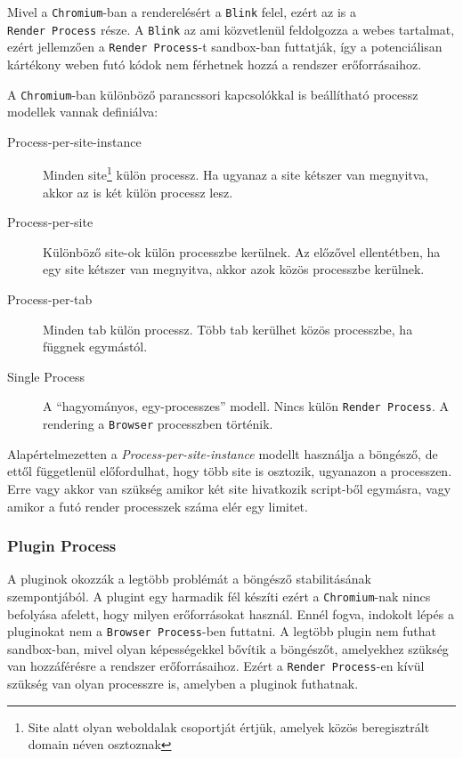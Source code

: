 \documentclass[12pt]{report}
\begin{document}
Mivel a \texttt{Chromium}-ban a renderelésért a \texttt{Blink} felel, ezért az is a \\
\texttt{Render Process} része. A \texttt{Blink} az ami közvetlenül feldolgozza a webes
tartalmat, ezért jellemzően a \texttt{Render Process}-t sandbox-ban futtatják, így a
potenciálisan kártékony weben futó kódok nem férhetnek hozzá a rendszer erőforrásaihoz.

A \texttt{Chromium}-ban különböző parancssori kapcsolókkal is beállítható processz modellek
vannak definiálva:
\begin{description}
    \item[Process-per-site-instance]
        Minden site\footnote{Site alatt olyan weboldalak csoportját értjük, amelyek
        közös beregisztrált domain néven osztoznak} külön processz.
        Ha ugyanaz a site kétszer van megnyitva, akkor az is két külön processz lesz.
    \item[Process-per-site]
        Különböző site-ok külön processzbe kerülnek. Az előzővel ellentétben, ha egy site
        kétszer van megnyitva, akkor azok közös processzbe kerülnek.
    \item[Process-per-tab]
        Minden tab külön processz. Több tab kerülhet közös processzbe, ha függnek egymástól.
    \item[Single Process]
        A ``hagyományos, egy-processzes'' modell. Nincs külön \texttt{Render Process}.
        A rendering a \texttt{Browser} processzben történik.
\end{description}

Alapértelmezetten a \textit{Process-per-site-instance} modellt használja a böngésző, de
ettől függetlenül előfordulhat, hogy több site is osztozik, ugyanazon a processzen.
Erre vagy akkor van szükség amikor két site hivatkozik script-ből egymásra,
vagy amikor a futó render processzek száma elér egy limitet.
\cite{bib-chromium-process-models}

\subsubsection{Plugin Process}
A pluginok okozzák a legtöbb problémát a böngésző stabilitásának szempontjából. A plugint
egy harmadik fél készíti ezért a \texttt{Chromium}-nak nincs befolyása afelett, hogy milyen
erőforrásokat használ. Ennél fogva, indokolt lépés a pluginokat nem a
\texttt{Browser Process}-ben futtatni. A legtöbb plugin nem futhat sandbox-ban, mivel olyan
képességekkel bővítik a böngészőt, amelyekhez szükség van hozzáférésre a rendszer
erőforrásaihoz. Ezért a \texttt{Render Process}-en kívül szükség van olyan processzre is,
amelyben a pluginok futhatnak.
\cite{bib-chromium-plugins}
\end{document}
